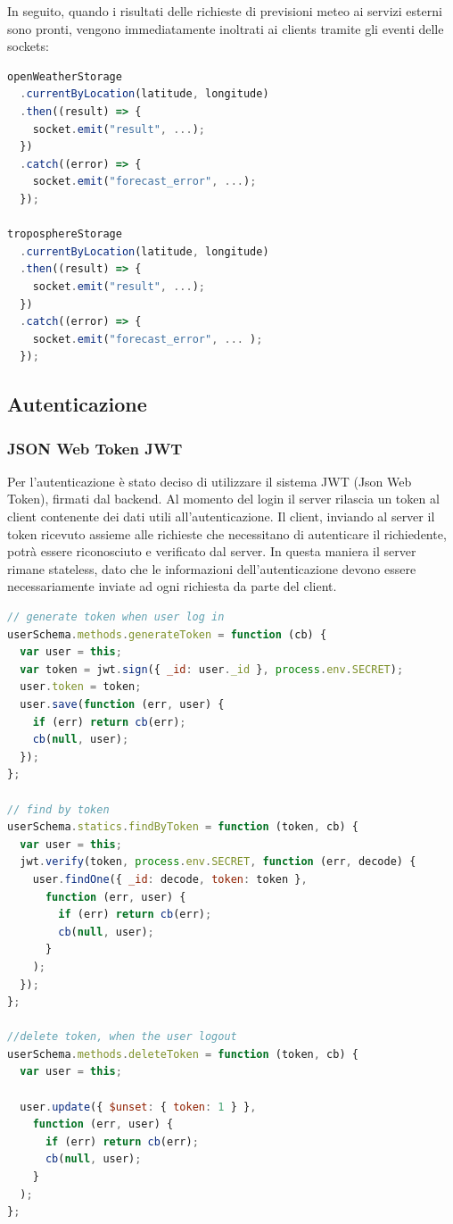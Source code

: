 In seguito, quando i risultati delle richieste di previsioni meteo ai servizi esterni sono pronti, vengono immediatamente inoltrati ai clients tramite gli eventi delle sockets:

\begin{lstlisting}[language=Javascript]
openWeatherStorage
  .currentByLocation(latitude, longitude)
  .then((result) => {
    socket.emit("result", ...);
  })
  .catch((error) => {
    socket.emit("forecast_error", ...);
  });
  
troposphereStorage
  .currentByLocation(latitude, longitude)
  .then((result) => {
    socket.emit("result", ...);
  })
  .catch((error) => {
    socket.emit("forecast_error", ... );
  });
\end{lstlisting}

\subsection{Autenticazione}

\subsubsection{JSON Web Token JWT}
Per l'autenticazione è stato deciso di utilizzare il sistema JWT (Json Web Token), firmati dal backend. Al momento del login il server rilascia un token al client contenente dei dati utili all’autenticazione. Il client, inviando al server il token ricevuto assieme alle richieste che necessitano di autenticare il richiedente, potrà essere riconosciuto e verificato dal server. In questa maniera il server rimane stateless, dato che le informazioni dell'autenticazione devono essere necessariamente inviate ad ogni richiesta da parte del client.

\begin{lstlisting}[language=Javascript]
// generate token when user log in
userSchema.methods.generateToken = function (cb) {
  var user = this;
  var token = jwt.sign({ _id: user._id }, process.env.SECRET);
  user.token = token;
  user.save(function (err, user) {
    if (err) return cb(err);
    cb(null, user);
  });
};

// find by token
userSchema.statics.findByToken = function (token, cb) {
  var user = this;
  jwt.verify(token, process.env.SECRET, function (err, decode) {
    user.findOne({ _id: decode, token: token },
      function (err, user) {
        if (err) return cb(err);
        cb(null, user);
      }
    );
  });
};

//delete token, when the user logout
userSchema.methods.deleteToken = function (token, cb) {
  var user = this;

  user.update({ $unset: { token: 1 } },
    function (err, user) {
      if (err) return cb(err);
      cb(null, user);
    }
  );
};

\end{lstlisting}

